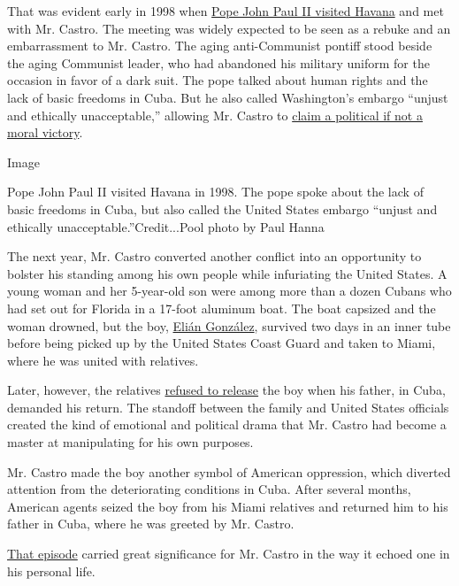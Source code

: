 That was evident early in 1998 when
\href{http://www.nytimes.com/1998/01/22/world/the-pope-in-cuba-the-overview-castro-and-cheering-crowds-greet-pope.html}{Pope
John Paul II visited Havana} and met with Mr. Castro. The meeting was
widely expected to be seen as a rebuke and an embarrassment to Mr.
Castro. The aging anti-Communist pontiff stood beside the aging
Communist leader, who had abandoned his military uniform for the
occasion in favor of a dark suit. The pope talked about human rights and
the lack of basic freedoms in Cuba. But he also called Washington's
embargo ``unjust and ethically unacceptable,'' allowing Mr. Castro to
\href{http://www.nytimes.com/1998/01/22/world/the-pope-in-cuba-the-implications-castro-s-spin-pope-is-on-our-side.html}{claim
a political if not a moral victory}.

Image

Pope John Paul II visited Havana in 1998. The pope spoke about the lack
of basic freedoms in Cuba, but also called the United States embargo
``unjust and ethically unacceptable.''Credit...Pool photo by Paul Hanna

The next year, Mr. Castro converted another conflict into an opportunity
to bolster his standing among his own people while infuriating the
United States. A young woman and her 5-year-old son were among more than
a dozen Cubans who had set out for Florida in a 17-foot aluminum boat.
The boat capsized and the woman drowned, but the boy,
\href{http://topics.nytimes.com/top/reference/timestopics/people/g/elian_gonzalez/index.html?8qa}{Elián
González}, survived two days in an inner tube before being picked up by
the United States Coast Guard and taken to Miami, where he was united
with relatives.

Later, however, the relatives
\href{http://www.nytimes.com/2000/04/14/us/elian-gonzalez-case-overview-cuban-s-family-defies-reno-court-issues-stay.html}{refused
to release} the boy when his father, in Cuba, demanded his return. The
standoff between the family and United States officials created the kind
of emotional and political drama that Mr. Castro had become a master at
manipulating for his own purposes.

Mr. Castro made the boy another symbol of American oppression, which
diverted attention from the deteriorating conditions in Cuba. After
several months, American agents seized the boy from his Miami relatives
and returned him to his father in Cuba, where he was greeted by Mr.
Castro.

\href{http://www.nytimes.com/2000/04/27/us/elian-gonzalez-case-counting-cost-castro-emerges-conflict-s-clear-winner.html}{That
episode} carried great significance for Mr. Castro in the way it echoed
one in his personal life.


